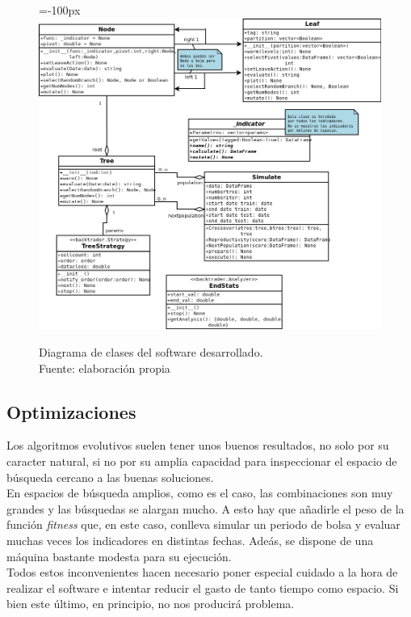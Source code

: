      	\begin{figure}[H]
    		\centering\leftskip=-100px
    		\includegraphics[scale=0.60]{imagenes/diagramaClases.png}
    	    \caption[Diagrama de clases del software desarrollado.]{Diagrama de clases del software desarrollado.\\ Fuente: elaboraci\'on propia}
    		\label{fig:diagclases}
	   \end{figure}

\subsection{Optimizaciones}\label{sec:timeimprove}

Los algoritmos evolutivos suelen tener unos buenos resultados, no solo por su caracter natural, si no por su amplia capacidad para inspeccionar el espacio de b\'usqueda cercano a las buenas soluciones.\\

En espacios de b\'usqueda amplios, como es el caso, las combinaciones son muy grandes y las b\'usquedas se alargan mucho. A esto hay que a\~nadirle el peso de la funci\'on \textit{fitness} que, en este caso, conlleva simular un periodo de bolsa y evaluar muchas veces los indicadores en distintas fechas. Ade\'as, se dispone de una m\'aquina bastante modesta para su ejecuci\'on.\\

Todos estos inconvenientes hacen necesario poner especial cuidado a la hora de realizar el software e intentar reducir el gasto de tanto tiempo como espacio. Si bien este \'ultimo, en principio, no nos producir\'a problema.\\

